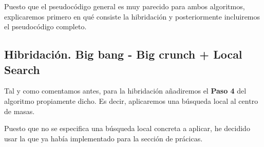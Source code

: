 \documentclass[10pt, a4paper]{article}
\theoremstyle{theorem-style}
\theoremstyle{theorem-style}
\theoremstyle{theorem2-style}
\theoremstyle{definition-style}
\theoremstyle{remark-style}
\theoremstyle{example-style}
\theoremstyle{definition-style}
\theoremstyle{remark-style}
\theoremstyle{remark-style}
\begin{document}
\vspace{1cm}

Puesto que el pseudocódigo general es muy parecido para ambos algoritmos, explicaremos primero en qué consiste la hibridación y posteriormente incluiremos el pseudocódigo completo. 

\subsection{Hibridación. Big bang - Big crunch + Local Search}

Tal y como comentamos antes, para la hibridación añadiremos el \textbf{Paso 4} del algoritmo propiamente dicho. Es decir, aplicaremos una búsqueda local al centro de masas. 

Puesto que no se especifica una búsqueda local concreta a aplicar, he decidido usar la que ya había implementado para la sección de prácicas. 
\end{document}
